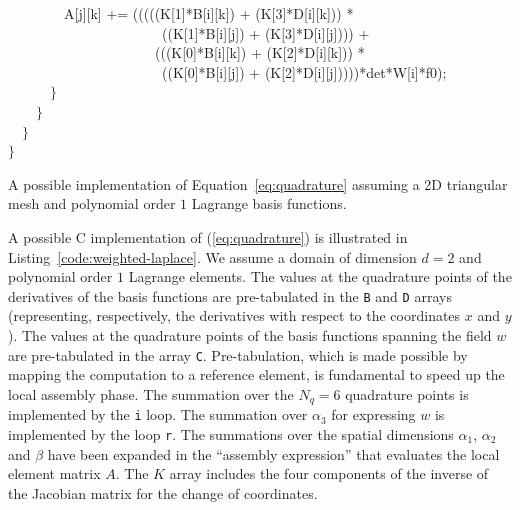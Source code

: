 \begin{algorithm}[h]
~~~~~~~~A[j][k] += (((((K[1]*B[i][k]) + (K[3]*D[i][k])) * \\
~~~~~~~~~~~~~~~~~~~~~~((K[1]*B[i][j]) + (K[3]*D[i][j]))) + \\
~~~~~~~~~~~~~~~~~~~~~(((K[0]*B[i][k]) + (K[2]*D[i][k])) * \\
~~~~~~~~~~~~~~~~~~~~~~((K[0]*B[i][j]) + (K[2]*D[i][j]))))*det*W[i]*f0);\\
~~~~~~$\rbrace$\\
~~~~$\rbrace$\\
~~$\rbrace$\\
$\rbrace$
\caption{A possible implementation of Equation~\ref{eq:quadrature} assuming a 2D triangular mesh and polynomial order $1$ Lagrange basis functions.}
\label{code:weighted-laplace}
\end{algorithm}



A possible C implementation of (\ref{eq:quadrature}) is illustrated in Listing~\ref{code:weighted-laplace}. We assume a domain of dimension $d=2$ and polynomial order $1$ Lagrange elements. The values at the quadrature points of the derivatives of the basis functions are pre-tabulated in the \texttt{B} and \texttt{D} arrays (representing, respectively, the derivatives with respect to the coordinates $x$ and $y$). The values at the quadrature points of the basis functions spanning the field $w$ are pre-tabulated in the array \texttt{C}. Pre-tabulation, which is made possible by mapping the computation to a reference element, is fundamental to speed up the local assembly phase. The summation over the $N_q = 6$ quadrature points is implemented by the \texttt{i} loop. The summation over $\alpha_3$ for expressing $w$ is implemented by the loop \texttt{r}. The summations over the spatial dimensions $\alpha_1$, $\alpha_2$ and $\beta$ have been expanded in the ``assembly expression'' that evaluates the local element matrix $A$. The $K$ array includes the four components of the inverse of the Jacobian matrix for the change of coordinates. 

